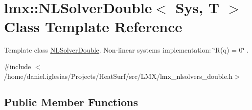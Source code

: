 \hypertarget{classlmx_1_1NLSolverDouble}{\section{lmx\-:\-:N\-L\-Solver\-Double$<$ Sys, T $>$ Class Template Reference}
\label{classlmx_1_1NLSolverDouble}
}


Template class \hyperlink{classlmx_1_1NLSolverDouble}{N\-L\-Solver\-Double}. Non-\/linear systems implementation\-: \char`\"{}\-R(q) = 0\char`\"{} .  




{\ttfamily \#include $<$/home/daniel.\-iglesias/\-Projects/\-Heat\-Surf/src/\-L\-M\-X/lmx\-\_\-nlsolvers\-\_\-double.\-h$>$}

\subsection*{Public Member Functions}
